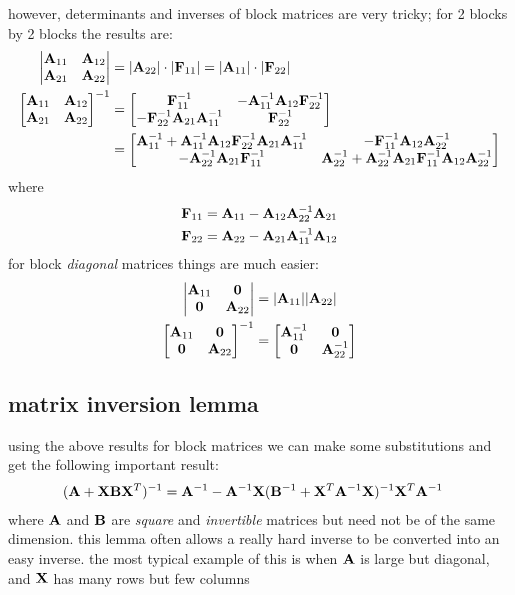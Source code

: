 \documentclass[12pt]{article}
\begin{document}
\noindent 
however, determinants and inverses of block matrices are very tricky;
for 2 blocks by 2 blocks the results are:
\begin{align}
\begin{vmatrix}\AA_{11}&\AA_{12}\\ \AA_{21}&\AA_{22}\end{vmatrix} 
&= |\AA_{22}| \cdot |\FF_{11}| = |\AA_{11}| \cdot  |\FF_{22}| \\ 
{\begin{bmatrix}\AA_{11}&\AA_{12}\\ \AA_{21}&\AA_{22}\end{bmatrix}}^{-1} &=
\begin{bmatrix}
\FF_{11}^{-1}&-\AA_{11}^{-1}\AA_{12}\FF_{22}^{-1}\\
-\FF_{22}^{-1}\AA_{21}\AA_{11}^{-1}& \FF_{22}^{-1}
\end{bmatrix} \\
&= \begin{bmatrix} 
\AA_{11}^{-1}+\AA_{11}^{-1} \AA_{12} \FF_{22}^{-1} \AA_{21} \AA_{11}^{-1} & 
-\FF_{11}^{-1} \AA_{12} \AA_{22}^{-1}\\
-\AA_{22}^{-1} \AA_{21} \FF_{11}^{-1} & 
\AA_{22}^{-1}+\AA_{22}^{-1} \AA_{21} \FF_{11}^{-1} \AA_{12} \AA_{22}^{-1}
\end{bmatrix} 
\end{align}
where
\begin{align}
\FF_{11} & = \AA_{11}-\AA_{12}\AA_{22}^{-1}\AA_{21} \\
\FF_{22} & = \AA_{22}-\AA_{21}\AA_{11}^{-1}\AA_{12}
\end{align}
for block {\em diagonal} matrices things are much easier:
\begin{align}
\begin{vmatrix}\AA_{11} & \ZZ \\ \ZZ & \AA_{22}\end{vmatrix} 
&=  |\AA_{11}||\AA_{22}|\\
{\begin{bmatrix}\AA_{11} & \ZZ \\ \ZZ &\AA_{22}\end{bmatrix}}^{-1} &=
\begin{bmatrix}
\AA_{11}^{-1} & \ZZ \\ \ZZ & \AA_{22}^{-1}
\end{bmatrix}
\end{align}

\subsection{matrix inversion lemma}
using the above results for block matrices we can make some
substitutions and get the following important result:
\begin{align}
(\AA + \XX\BB\XX^T)^{-1} & = 
\AA^{-1}-\AA^{-1}\XX(\BB^{-1}+\XX^T\AA^{-1}\XX)^{-1}\XX^T\AA^{-1}
\end{align}
where $\AA$ and $\BB$ are {\em square} and {\em invertible} matrices
but need not be of the same dimension.
this lemma often
allows a really hard inverse to be converted into an easy inverse. the
most typical example of this is when $\AA$ is large but diagonal, and
$\XX$ has many rows but few columns
\end{document}
